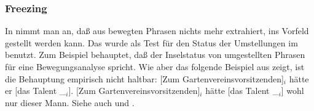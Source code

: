 \subsubsection{Freezing}

In \gb nimmt man an, daß aus bewegten Phrasen nichts mehr extrahiert, \dash \zb ins Vorfeld gestellt werden kann.
Das wurde als Test für den Status der Umstellungen im \mf benutzt. Zum Beispiel \citet{Diesing92a} behauptet,
daß der Inselstatus von umgestellten Phrasen für eine Bewegungsanalyse spricht. Wie aber
das folgende Beispiel aus  zeigt, ist die Behauptung empirisch nicht haltbar:
\eal
\ex {}[Zum Gartenvereinsvorsitzenden]$_i$ hätte er [das Talent \_$_i$].
\ex {}[Zum Gartenvereinsvorsitzenden]$_i$ hätte [das Talent \_$_i$] wohl nur dieser Mann.\label{bsp-gartenvereinsvorsitzender}
\zl
Siehe auch  und .%




